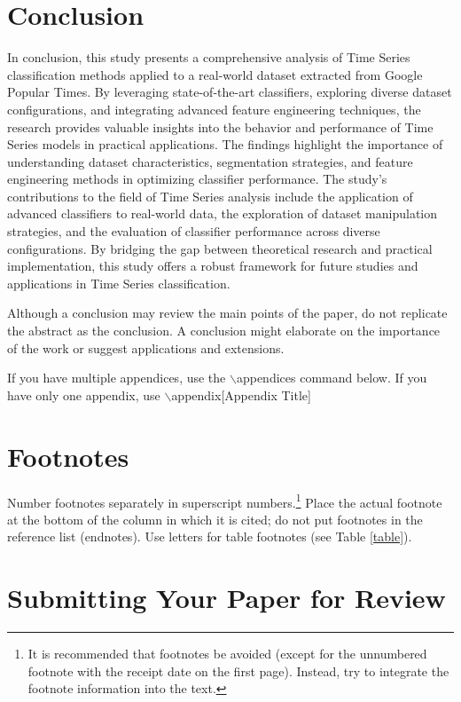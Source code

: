 \documentclass{ieeeaccess}
\begin{document}
\section{Conclusion}

In conclusion, this study presents a comprehensive analysis of Time Series classification methods applied to a real-world dataset extracted from Google Popular Times. By leveraging state-of-the-art classifiers, exploring diverse dataset configurations, and integrating advanced feature engineering techniques, the research provides valuable insights into the behavior and performance of Time Series models in practical applications. The findings highlight the importance of understanding dataset characteristics, segmentation strategies, and feature engineering methods in optimizing classifier performance. The study's contributions to the field of Time Series analysis include the application of advanced classifiers to real-world data, the exploration of dataset manipulation strategies, and the evaluation of classifier performance across diverse configurations. By bridging the gap between theoretical research and practical implementation, this study offers a robust framework for future studies and applications in Time Series classification.

Although a conclusion may review the  main points of the paper, do not replicate the abstract as the conclusion. A
conclusion might elaborate on the importance of the work or suggest
applications and extensions.

If you have multiple appendices, use the $\backslash$appendices command below. If you have only one appendix, use
$\backslash$appendix[Appendix Title]

\appendices
\section{\break Footnotes}
Number footnotes separately in superscript numbers.\footnote{It is recommended that footnotes be avoided (except for
the unnumbered footnote with the receipt date on the first page). Instead,
try to integrate the footnote information into the text.} Place the actual
footnote at the bottom of the column in which it is cited; do not put
footnotes in the reference list (endnotes). Use letters for table footnotes
(see Table \ref{table}).

\section{\break Submitting Your Paper for Review}
\end{document}
